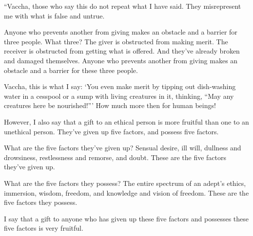 \documentclass[12pt,openany]{book}%
\begin{document}
“Vaccha, those who say this do not repeat what I have said. They misrepresent me with what is false and untrue. 

Anyone who prevents another from giving makes an obstacle and a barrier for three people. What three? The giver is obstructed from making merit. The receiver is obstructed from getting what is offered. And they’ve already broken and damaged themselves. Anyone who prevents another from giving makes an obstacle and a barrier for these three people. 

Vaccha, this is what I say: ‘You even make merit by tipping out dish-washing water in a cesspool or a sump with living creatures in it, thinking, “May any creatures here be nourished!”’ How much more then for human beings! 

However, I also say that a gift to an ethical person is more fruitful than one to an unethical person. They’ve given up five factors, and possess five factors. 

What are the five factors they’ve given up? Sensual desire, ill will, dullness and drowsiness, restlessness and remorse, and doubt. These are the five factors they’ve given up. 

What are the five factors they possess? The entire spectrum of an adept’s ethics, immersion, wisdom, freedom, and knowledge and vision of freedom. These are the five factors they possess. 

I say that a gift to anyone who has given up these five factors and possesses these five factors is very fruitful. 
\end{document}
